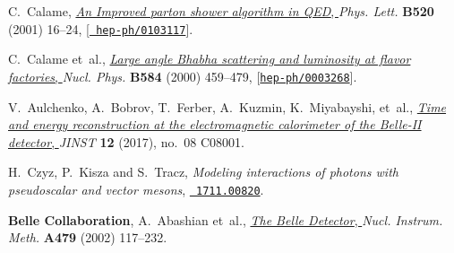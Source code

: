 \documentclass[11pt,a4paper]{article}
\begin{document}
\begin{thebibliography}{10}
C.~Calame, \href{http://dx.doi.org/10.1016/S0370-2693(01)01108-X}{{\it {An
  Improved parton shower algorithm in QED}}, } {\em Phys. Lett.} {\bf B520}
  (2001) 16--24, [\href{http://arxiv.org/abs/hep-ph/0103117}{{\tt
  hep-ph/0103117}}].

C.~Calame et~al., \href{http://dx.doi.org/10.1016/S0550-3213(00)00356-4}{{\it
  {Large angle Bhabha scattering and luminosity at flavor factories}}, } {\em
  Nucl. Phys.} {\bf B584} (2000) 459--479,
  [\href{http://arxiv.org/abs/hep-ph/0003268}{{\tt hep-ph/0003268}}].

V.~Aulchenko, A.~Bobrov, T.~Ferber, A.~Kuzmin, K.~Miyabayshi, et~al.,
  \href{http://dx.doi.org/10.1088/1748-0221/12/08/C08001}{{\it {Time and energy
  reconstruction at the electromagnetic calorimeter of the Belle-II detector}},
  } {\em JINST} {\bf 12} (2017), no.~08 C08001.

H.~Czyz, P.~Kisza and S.~Tracz, {\it {Modeling interactions of photons with pseudoscalar and vector mesons}},  \href{http://arxiv.org/abs/1711.00820}{{\tt
  1711.00820}}.
  
{\bf Belle Collaboration}, A.~Abashian et~al.,
  \href{http://dx.doi.org/10.1016/S0168-9002(01)02013-7}{{\it {The Belle
  Detector}}, } {\em Nucl. Instrum. Meth.} {\bf A479} (2002) 117--232.

\end{thebibliography}\endgroup
\end{document}
